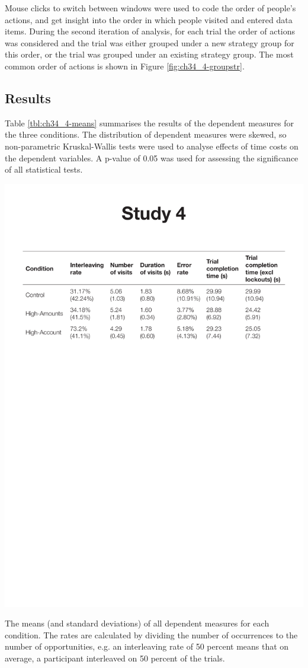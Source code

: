 Mouse clicks to switch between windows were used to code the order of people's actions, and get insight into the order in which people visited and entered data items. During the second iteration of analysis, for each trial the order of actions was considered and the trial was either grouped under a new strategy group for this order, or the trial was grouped under an existing strategy group. The most common order of actions is shown in Figure \ref{fig:ch34_4-groupstr}.

\subsection{Results}
Table \ref{tbl:ch34_4-means} summarises the results of the dependent measures for the three conditions. The distribution of dependent measures were skewed, so non-parametric Kruskal-Wallis tests were used to analyse effects of time costs on the dependent variables. A p-value of 0.05 was used for assessing the significance of all statistical tests. 

\begin{table}
 \includegraphics[width=\textwidth]{images/ch34/ch34-means.pdf}
\caption{The means (and standard deviations) of all dependent measures for each condition. The rates are calculated by dividing the number of occurrences to the number of opportunities, e.g. an interleaving rate of 50 percent means that on average, a participant interleaved on 50 percent of the trials.}
\label{tbl:ch34_4-means}
\end{table}

